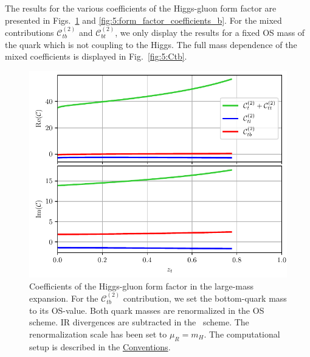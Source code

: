 The results for the various coefficients of the Higgs-gluon form factor are presented in Figs.~\ref{fig:5:form_factor_coefficients_t} and \ref{fig:5:form_factor_coefficients_b}. For the mixed contributions $\mathcal{C}^{(2)}_{tb}$ and $\mathcal{C}^{(2)}_{bt}$, we only display the results for a fixed \acs{OS} mass of the quark which is not coupling to the Higgs. The full mass dependence of the mixed coefficients is displayed in Fig.~\ref{fig:5:Ctb}.
\begin{figure}[ht]
\centering
\includegraphics[width=\figurewidth]{Images/form_factor_coefficients_t.pdf}
\caption{Coefficients of the Higgs-gluon form factor in the large-mass expansion. For the $\mathcal{C}_{tb}^{(2)}$ contribution, we set the bottom-quark mass to its \acs{OS}-value. Both quark masses are renormalized in the \acs{OS} scheme. \acs{IR} divergences are subtracted in the \MS\ scheme. The renormalization scale has been set to $\mu_R = m_H$. The computational setup is described in the \hyperref[chap:notation_and_conventions]{Conventions}.}
\label{fig:5:form_factor_coefficients_t}
\end{figure}
